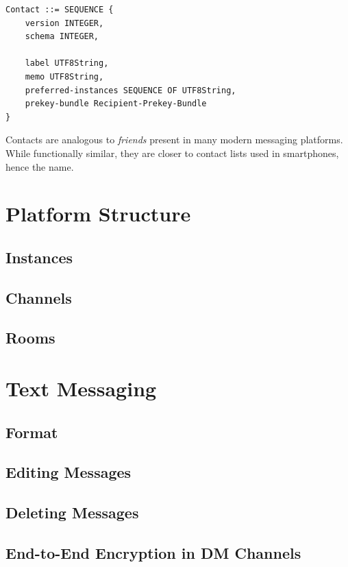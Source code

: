 \documentclass{article}
\begin{document}
\begin{lstlisting}
Contact ::= SEQUENCE {
	version INTEGER,
	schema INTEGER,

	label UTF8String,
	memo UTF8String,
	preferred-instances SEQUENCE OF UTF8String,
	prekey-bundle Recipient-Prekey-Bundle
}
\end{lstlisting}

Contacts are analogous to \textit{friends} present in many modern messaging platforms. While functionally similar, they are closer to contact lists used in smartphones, hence the name.

\section{Platform Structure}

\subsection{Instances} \label{3_1}

\subsection{Channels}

\subsection{Rooms}


\section{Text Messaging}

\subsection{Format}

\subsection{Editing Messages}

\subsection{Deleting Messages}

\subsection{End-to-End Encryption in DM Channels}
\end{document}
